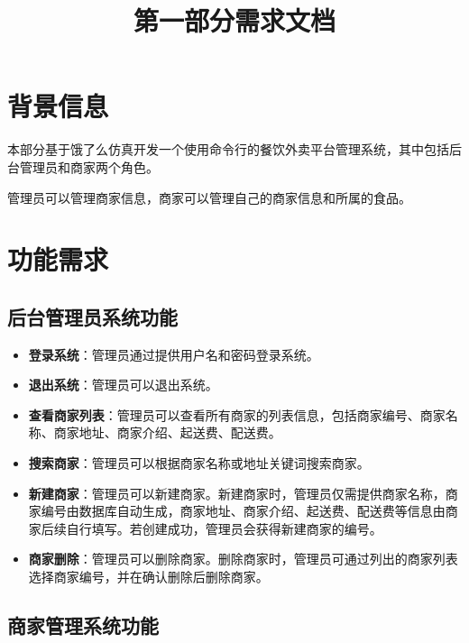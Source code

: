 \documentclass[UTF8]{ctexart}
\title{\vspace{-1.5cm}第一部分需求文档\vspace{-2em}}
\date{}
\begin{document}
\maketitle
\section{背景信息}
本部分基于饿了么仿真开发一个使用命令行的餐饮外卖平台管理系统，其中包括后台管理员和商家两个角色。

管理员可以管理商家信息，商家可以管理自己的商家信息和所属的食品。

\section{功能需求}

\subsection{后台管理员系统功能}

\begin{itemize}
    \item \textbf{登录系统}：管理员通过提供用户名和密码登录系统。
    \item \textbf{退出系统}：管理员可以退出系统。
    \item \textbf{查看商家列表}：管理员可以查看所有商家的列表信息，包括商家编号、商家名称、商家地址、商家介绍、起送费、配送费。
    \item \textbf{搜索商家}：管理员可以根据商家名称或地址关键词搜索商家。
    \item \textbf{新建商家}：管理员可以新建商家。新建商家时，管理员仅需提供商家名称，商家编号由数据库自动生成，商家地址、商家介绍、起送费、配送费等信息由商家后续自行填写。若创建成功，管理员会获得新建商家的编号。
    \item \textbf{商家删除}：管理员可以删除商家。删除商家时，管理员可通过列出的商家列表选择商家编号，并在确认删除后删除商家。
\end{itemize}

\subsection{商家管理系统功能}
\end{document}

